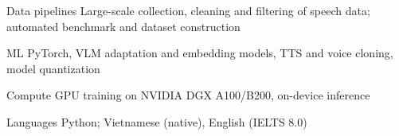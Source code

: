 

\begin{cvskills}

  \cvskill
    {Data pipelines} %
    {Large-scale collection, cleaning and filtering of speech data; automated benchmark and dataset construction}

  \cvskill
    {ML} %
    {PyTorch, VLM adaptation and embedding models, TTS and voice cloning, model quantization}

  \cvskill
    {Compute} %
    {GPU training on NVIDIA DGX A100/B200, on-device inference}

  \cvskill
    {Languages} %
    {Python; Vietnamese (native), English (IELTS 8.0)}

\end{cvskills}
